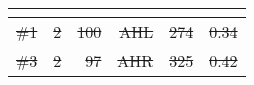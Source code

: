 \documentclass[preprint,review,12pt]{elsarticle}%
\providecommand{\DIFaddtex}[1]{{\protect\color{blue}\uwave{#1}}} %
\providecommand{\DIFdeltex}[1]{{\protect\color{red}\sout{#1}}}                      %
\providecommand{\DIFaddend}{} %
\providecommand{\DIFdelbegin}{} %
\providecommand{\DIFaddFL}[1]{\DIFadd{#1}} %
\providecommand{\DIFdelFL}[1]{\DIFdel{#1}} %
\providecommand{\DIFaddbeginFL}{} %
\providecommand{\DIFaddendFL}{} %
\providecommand{\DIFdelbeginFL}{} %
\providecommand{\DIFdelendFL}{} %
\providecommand{\DIFadd}[1]{\texorpdfstring{\DIFaddtex{#1}}{#1}} %
\providecommand{\DIFdel}[1]{\texorpdfstring{\DIFdeltex{#1}}{}} %
\newcommand{\DIFscaledelfig}{0.5}
\newlength{\DIFdelgraphicswidth} %
\newlength{\DIFdelgraphicsheight} %
\newcommand{\DIFaddincludegraphics}[2][]{{\color{blue}\fbox{\DIFOincludegraphics[#1]{#2}}}} %
\newcommand{\DIFdelincludegraphics}[2][]{%
\sbox{\DIFdelgraphicsbox}{\DIFOincludegraphics[#1]{#2}}%
\settoboxwidth{\DIFdelgraphicswidth}{\DIFdelgraphicsbox} %
\settoboxtotalheight{\DIFdelgraphicsheight}{\DIFdelgraphicsbox} %
\scalebox{\DIFscaledelfig}{%
\parbox[b]{\DIFdelgraphicswidth}{\usebox{\DIFdelgraphicsbox}\\[-\baselineskip] \rule{\DIFdelgraphicswidth}{0em}}\llap{\resizebox{\DIFdelgraphicswidth}{\DIFdelgraphicsheight}{%
\setlength{\unitlength}{\DIFdelgraphicswidth}%
\begin{picture}(1,1)%
\thicklines\linethickness{2pt} %
{\color[rgb]{1,0,0}\put(0,0){\framebox(1,1){}}}%
{\color[rgb]{1,0,0}\put(0,0){\line( 1,1){1}}}%
{\color[rgb]{1,0,0}\put(0,1){\line(1,-1){1}}}%
\end{picture}%
}\hspace*{3pt}}} %
} %
\DeclareRobustCommand{\DIFaddend}{\DIFOaddend \let\includegraphics\DIFOincludegraphics} %
\DeclareRobustCommand{\DIFdelbegin}{\DIFOdelbegin \let\includegraphics\DIFdelincludegraphics} %
\DeclareRobustCommand{\DIFaddbeginFL}{\DIFOaddbeginFL \let\includegraphics\DIFaddincludegraphics} %
\DeclareRobustCommand{\DIFaddendFL}{\DIFOaddendFL \let\includegraphics\DIFOincludegraphics} %
\DeclareRobustCommand{\DIFdelbeginFL}{\DIFOdelbeginFL \let\includegraphics\DIFdelincludegraphics} %
\DeclareRobustCommand{\DIFdelendFL}{\DIFOaddendFL \let\includegraphics\DIFOincludegraphics} %
\begin{document}
\DIFaddend {}
\DIFdelbegin %
\DIFdelendFL \DIFaddbeginFL \begin{table}[htbp]
\DIFaddendFL \centering
\DIFdelbeginFL %
\DIFdelendFL \DIFaddbeginFL \tiny
\setlength{\tabcolsep}{4pt}
\begin{tabular}{*{6}{r}}
\DIFaddendFL \toprule
\textbf{\DIFdelbeginFL %
\DIFdelendFL \DIFaddbeginFL \thead{$\mathrm{Subject\ ID}$}\DIFaddendFL } & \textbf{\DIFdelbeginFL %
\DIFdelendFL \DIFaddbeginFL \thead{$\mathrm{\#\ of\ sessions}$}\DIFaddendFL } & \textbf{\DIFdelbeginFL %
\DIFdelendFL \DIFaddbeginFL \thead{$\mathrm{\#\ of\ trials}$}\DIFaddendFL } & \textbf{\DIFdelbeginFL %
\DIFdelendFL \DIFaddbeginFL \thead{$\mathrm{ROI}$}\DIFaddendFL } & \textbf{\DIFdelbeginFL %
\DIFdelendFL \DIFaddbeginFL \thead{$\mathrm{\#\ of\ SWRs}$}\DIFaddendFL } & \textbf{\DIFdelbeginFL %
}%
\DIFdelendFL \DIFaddbeginFL \thead{$\mathrm{SWR\ incidence\ [Hz]
}$}\DIFaddendFL } & \\
\midrule
\DIFdelbeginFL \DIFdelFL{\#1 }\DIFdelendFL \DIFaddbeginFL \DIFaddFL{$\mathrm{\#1}$ }\DIFaddendFL & \DIFdelbeginFL \DIFdelFL{2 }\DIFdelendFL \DIFaddbeginFL \DIFaddFL{$\mathrm{2}$ }\DIFaddendFL & \DIFdelbeginFL \DIFdelFL{100 }\DIFdelendFL \DIFaddbeginFL \DIFaddFL{$\mathrm{100}$ }\DIFaddendFL & \DIFdelbeginFL \DIFdelFL{AHL }\DIFdelendFL \DIFaddbeginFL \DIFaddFL{$\mathrm{AHL}$ }\DIFaddendFL & \DIFdelbeginFL \DIFdelFL{274 }\DIFdelendFL \DIFaddbeginFL \DIFaddFL{$\mathrm{274}$ }\DIFaddendFL & \DIFdelbeginFL \DIFdelFL{0.34
}\DIFdelendFL \DIFaddbeginFL \DIFaddFL{$\mathrm{0.34}$}\DIFaddendFL \\
\rowcolor{lightgray}
\DIFdelbeginFL \DIFdelFL{\#3 }\DIFdelendFL \DIFaddbeginFL \DIFaddFL{$\mathrm{\#3}$ }\DIFaddendFL & \DIFdelbeginFL \DIFdelFL{2 }\DIFdelendFL \DIFaddbeginFL \DIFaddFL{$\mathrm{2}$ }\DIFaddendFL & \DIFdelbeginFL \DIFdelFL{97 }\DIFdelendFL \DIFaddbeginFL \DIFaddFL{$\mathrm{97}$ }\DIFaddendFL & \DIFdelbeginFL \DIFdelFL{AHR }\DIFdelendFL \DIFaddbeginFL \DIFaddFL{$\mathrm{AHR}$ }\DIFaddendFL & \DIFdelbeginFL \DIFdelFL{325 }\DIFdelendFL \DIFaddbeginFL \DIFaddFL{$\mathrm{325}$ }\DIFaddendFL & \DIFdelbeginFL \DIFdelFL{0.42
}\DIFdelendFL \DIFaddbeginFL \DIFaddFL{$\mathrm{0.42}$}\DIFaddendFL \\

\end{tabular}
\end{table}
\end{document}
